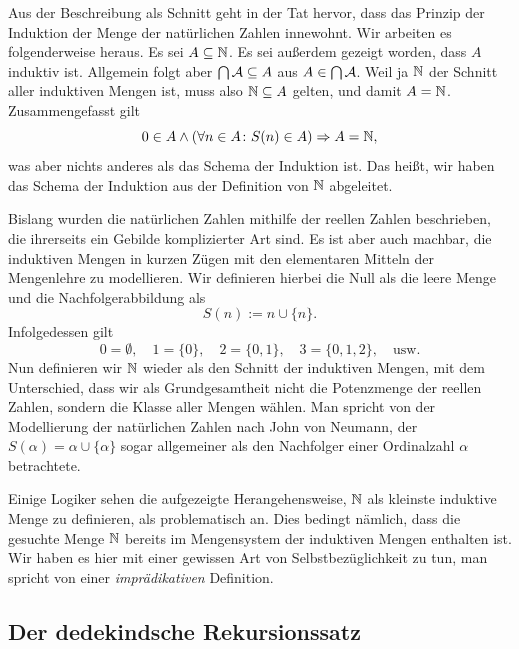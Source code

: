 \noindent
Aus der Beschreibung als Schnitt geht in der Tat hervor, dass das
Prinzip der Induktion der Menge der natürlichen Zahlen innewohnt.
Wir arbeiten es folgenderweise heraus. Es sei $A\subseteq\mathbb N$. Es sei
außerdem gezeigt worden, dass $A$ induktiv ist. Allgemein folgt aber
$\bigcap\mathcal{A}\subseteq A$ aus $A\in\bigcap\mathcal{A}$. Weil ja
$\mathbb N$ der Schnitt aller induktiven Mengen ist, muss also $\mathbb N\subseteq A$
gelten, und damit $A=\mathbb N$. Zusammengefasst gilt
\[0\in A\land (\forall n\in A\colon S(n)\in A)\Rightarrow A = \mathbb N,\]
was aber nichts anderes als das Schema der Induktion%
 ist. Das heißt,
wir haben das Schema der Induktion aus der Definition von $\mathbb N$ abgeleitet.

Bislang wurden die natürlichen Zahlen mithilfe der reellen Zahlen
beschrieben, die ihrerseits ein Gebilde komplizierter Art sind.
Es ist aber auch machbar, die induktiven Mengen in kurzen Zügen mit
den elementaren Mitteln der Mengenlehre zu modellieren. Wir definieren
hierbei die Null als die leere Menge und die Nachfolgerabbildung als
\[S(n) := n\cup \{n\}.\]
Infolgedessen gilt
\[0 = \emptyset,\quad 1 = \{0\},\quad 2 = \{0, 1\},\quad
3 = \{0, 1, 2\},\quad\text{usw.}\]
Nun definieren wir $\mathbb N$ wieder als den Schnitt der induktiven Mengen,
mit dem Unterschied, dass wir als Grundgesamtheit nicht die Potenzmenge
der reellen Zahlen, sondern die Klasse aller Mengen wählen. Man spricht
von der Modellierung der natürlichen Zahlen nach John von Neumann,
der $S(\alpha) = \alpha\cup\{\alpha\}$ sogar allgemeiner als den
Nachfolger einer Ordinalzahl $\alpha$ betrachtete.

Einige Logiker sehen die aufgezeigte Herangehensweise, $\mathbb N$ als kleinste
induktive Menge zu definieren, als problematisch an. Dies bedingt
nämlich, dass die gesuchte Menge $\mathbb N$ bereits im Mengensystem der
induktiven Mengen enthalten ist. Wir haben es hier mit einer gewissen
Art von Selbstbezüglichkeit zu tun, man spricht von einer
\emph{imprädikativen} Definition.

\subsection{Der dedekindsche Rekursionssatz}

